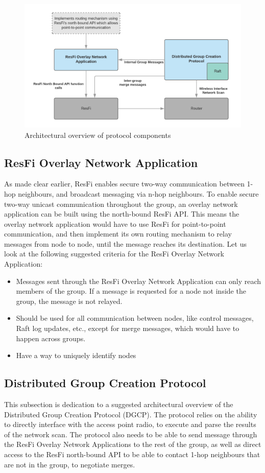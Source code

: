 \begin{figure}
	\includegraphics[width=\textwidth]{Images/dgcpoverview.png}
		\caption{Architectural overview of protocol components }%
		\label{fig:dgcpoverview}%
\end{figure}


\subsection{ResFi Overlay Network Application}
As made clear earlier, ResFi enables secure two-way communication between 1-hop neighbours, and broadcast messaging via n-hop neighbours. 
To enable secure two-way unicast communication throughout the group, an overlay network application can be built using the north-bound ResFi API. 
This means the overlay network application would have to use ResFi for point-to-point communication, and then implement its own routing mechanism
to relay messages from node to node, until the message reaches its destination. Let us look at the following suggested criteria for the ResFi Overlay Network Application:

\begin{itemize}
	\item Messages sent through the ResFi Overlay Network Application can only reach members of the group. If a message is requested for a node not inside the group,
		the message is not relayed.
  \item Should be used for all communication between nodes, like control messages, Raft log updates, etc., except for merge messages, which would have to happen across
		groups. 
	\item Have a way to uniquely identify nodes
\end{itemize}


\subsection{Distributed Group Creation Protocol}
This subsection is dedication to a suggested architectural overview of the Distributed Group Creation Protocol (DGCP). 
The protocol relies on the ability to directly interface with the access point radio, to execute and parse the results of the network scan. The protocol also
needs to be able to send message through the ResFi Overlay Network Applications to the rest of the group, as well as direct access to the ResFi north-bound API to be able to contact 1-hop
neighbours that are not in the group, to negotiate merges. 

